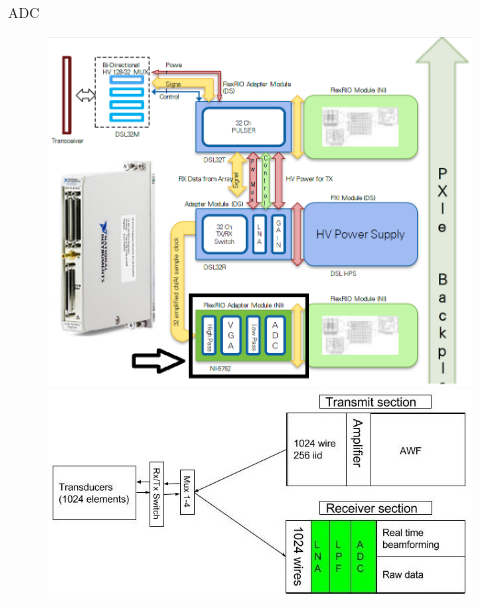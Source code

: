 \documentclass[t,12pt,english
\ifx\beamermode\undefined\else,\beamermode\fi
]{beamer}
\begin{document}
\begin{frame}{ADC}

\begin{figure}[!htb]
\includegraphics[width=.95\textwidth]{2_4.png}
\endminipage
{}
\includegraphics[width=1\textwidth,left]{44.jpg}
\endminipage
\end{figure}

\end{frame}
\end{document}

